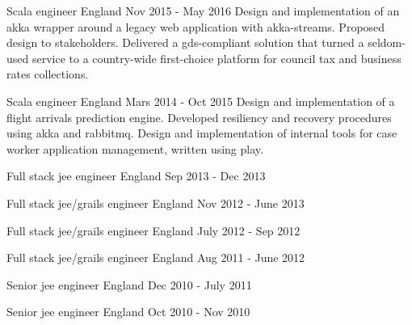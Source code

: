 \begin{cventries}
  \cventry
    {Scala engineer} %
    {} %
    {England} %
    {Nov 2015 - May 2016} %
    {} %
    {
Design and implementation of an akka wrapper around a legacy web application with akka-streams. Proposed design to stakeholders.
Delivered a gds-compliant solution that turned a seldom-used service to a country-wide first-choice platform for council tax and business rates collections.
    }

  \cventry
    {Scala engineer} %
    {} %
    {England} %
    {Mars 2014 - Oct 2015} %
    {} %
    {
Design and implementation of a flight arrivals prediction engine. Developed resiliency and recovery procedures using akka and rabbitmq.
Design and implementation of internal tools for case worker application management, written using play.
    }

  \cventry
    {Full stack jee engineer} %
    {} %
    {England} %
    {Sep 2013 - Dec 2013} %
    {}
    {}

  \cventry
    {Full stack jee/grails engineer} %
    {} %
    {England} %
    {Nov 2012 - June 2013} %
    {}
    {}

  \cventry
    {Full stack jee/grails engineer} %
    {} %
    {England} %
    {July 2012 - Sep 2012} %
    {}
    {}

  \cventry
    {Full stack jee/grails engineer} %
    {} %
    {England} %
    {Aug 2011 - June 2012} %
    {}
    {}

  \cventry
    {Senior jee engineer} %
    {} %
    {England} %
    {Dec 2010 - July 2011} %
    {}
    {}

  \cventry
    {Senior jee engineer} %
    {} %
    {England} %
    {Oct 2010 - Nov 2010} %
    {}
    {}
\end{cventries}

